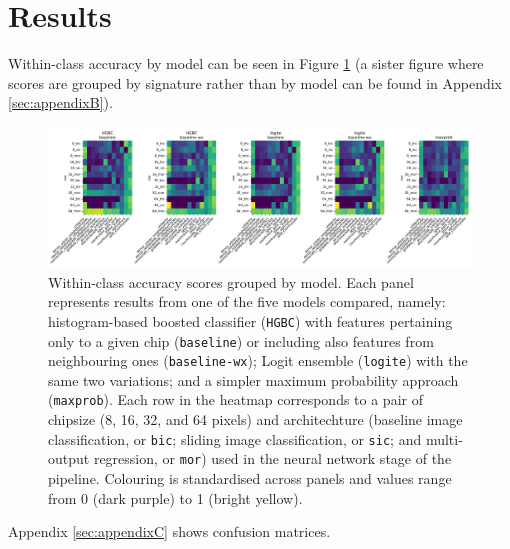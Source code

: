 \section{Results} %
\label{sec:results}



Within-class accuracy by model can be seen in Figure
\ref{fig:wc_accuracy_x_model} (a sister figure where scores are grouped by
        signature rather than by model can be found in Appendix
\ref{sec:appendixB}).

\begin{figure}
    \centering
    \includegraphics[width=1.0\linewidth]{fig/wc_accuracy_x_model.png}
    \caption{\footnotesize Within-class accuracy scores grouped by model. Each panel
    represents results from one of the five models compared, namely:
    histogram-based boosted classifier (\texttt{HGBC}) with features
    pertaining only to a given chip (\texttt{baseline}) or including also features
    from neighbouring ones (\texttt{baseline-wx}); Logit ensemble
    (\texttt{logite}) with the same two variations; and a simpler maximum
    probability approach (\texttt{maxprob}). Each row in the heatmap
    corresponds to a pair of chipsize (8, 16, 32, and 64 pixels)
    and architechture (baseline image classification, or \texttt{bic}; sliding
            image classification, or \texttt{sic}; and multi-output
    regression, or \texttt{mor}) used in the neural network stage of the
    pipeline. Colouring is standardised across panels and values range from
    0 (dark purple) to 1 (bright yellow).}
    \label{fig:wc_accuracy_x_model}
\end{figure}

Appendix \ref*{sec:appendixC} shows confusion matrices.

